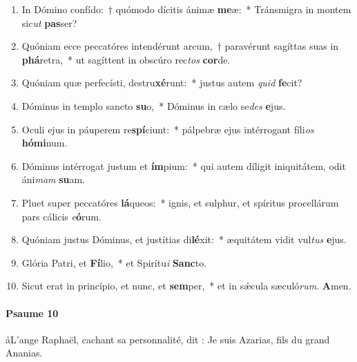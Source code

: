 \documentclass[twoside]{article}
\begin{document}
\begin{paracol}[1]{2}
\begin{enumerate}[wide, itemsep=0mm, labelwidth=!, labelindent=0pt, label=\color{gregoriocolor}\theenumi]
\item In Dómino confído:~† quómodo dícitis ánimæ \textbf{me}æ:~* Tránsmigra in montem sic\textit{ut} \textbf{pas}ser?
\item Quóniam ecce peccatóres intendérunt arcum,~† paravérunt sagíttas suas in \textbf{phá}retra,~* ut sagíttent in obscúro rec\textit{tos} \textbf{cor}de.
\item Quóniam quæ perfecísti, destru\textbf{xé}runt:~* justus autem \textit{quid} \textbf{fe}cit?
\item Dóminus in templo sancto \textbf{su}o,~* Dóminus in cælo se\textit{des} \textbf{e}jus.
\item Oculi ejus in páuperem re\textbf{spí}ciunt:~* pálpebræ ejus intérrogant fíli\textit{os} \textbf{hó}\textbf{mi}num.
\item Dóminus intérrogat justum et \textbf{ím}pium:~* qui autem díligit iniquitátem, odit áni\textit{mam} \textbf{su}am.
\item Pluet super peccatóres \textbf{lá}queos:~* ignis, et sulphur, et spíritus procellárum pars cálicis \textit{e}\textbf{ó}rum.
\item Quóniam justus Dóminus, et justítias di\textbf{lé}xit:~* æquitátem vidit vul\textit{tus} \textbf{e}jus.
\item Glória Patri, et \textbf{Fí}lio,~* et Spirítu\textit{i} \textbf{Sanc}to.
\item Sicut erat in princípio, et nunc, et \textbf{sem}per,~* et in sǽcula sæculó\textit{rum}. \textbf{A}men.
\end{enumerate}

\switchcolumn

\paragraph{Psaume 10}
\aa L’ange Raphaël, cachant sa personnalité, dit : Je suis Azarias, fils du grand Ananias.




\end{paracol}
\end{document}
